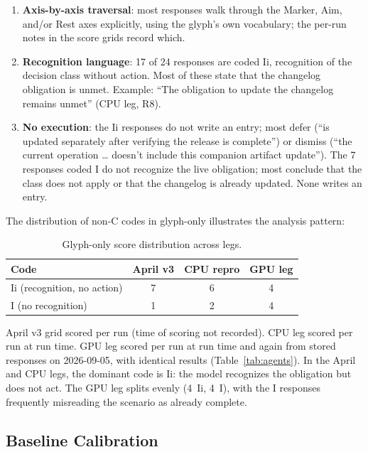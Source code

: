 \documentclass[11pt,a4paper]{article}
\begin{document}
\begin{enumerate}
  \item \textbf{Axis-by-axis traversal}: most responses walk through the
    Marker, Aim, and/or Rest axes explicitly, using the glyph's own vocabulary;
    the per-run notes in the score grids record which.
    \item \textbf{Recognition language}: 17 of 24 responses are coded Ii,
    recognition of the decision class without action. Most of these state
    that the changelog obligation is unmet. Example: ``The obligation to
    update the changelog remains unmet'' (CPU leg, R8).
  \item \textbf{No execution}: the Ii responses do not write an entry; most
    defer (``is updated separately after verifying the release is complete'')
    or dismiss (``the current operation \ldots{} doesn't include this
    companion artifact update''). The 7 responses coded I do not recognize the live obligation;
    most conclude that the class does not apply or that the changelog is
    already updated. None writes an entry.
\end{enumerate}

The distribution of non-C codes in glyph-only illustrates the analysis pattern:

\begin{table}[h]
\centering
\caption{Glyph-only score distribution across legs.}
\label{tab:glyph-dist}
\begin{tabular}{@{}lccc@{}}
\toprule
Code & April v3 & CPU repro & GPU leg \\
\midrule
Ii (recognition, no action) & 7 & 6 & 4 \\
I (no recognition)          & 1 & 2 & 4 \\
\bottomrule
\end{tabular}

\smallskip
\footnotesize
April v3 grid scored per run (time of scoring not recorded). CPU leg scored
per run at run time. GPU leg scored per run at run time and again from stored
responses on 2026-09-05, with identical results (Table~\ref{tab:agents}). In the April and CPU legs, the dominant code is Ii: the
model recognizes the obligation but does not act. The GPU leg splits evenly
(4~Ii, 4~I), with the I responses frequently misreading the scenario as
already complete.
\end{table}

\subsection{Baseline Calibration}
\end{document}
